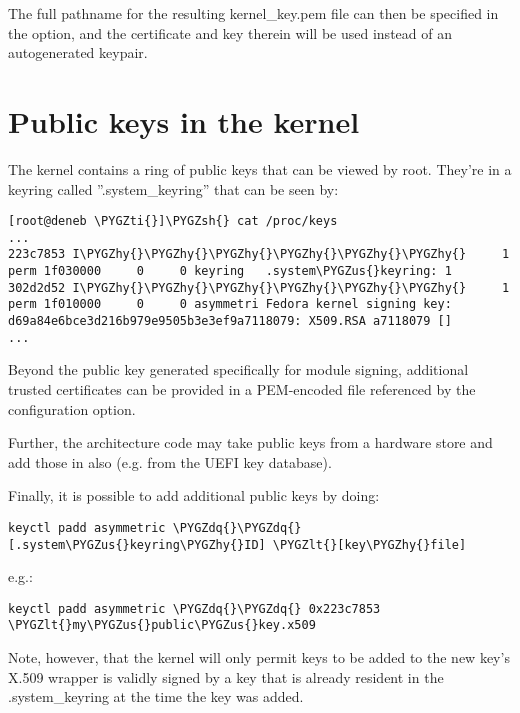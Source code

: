 \documentclass[a4paper,8pt,english]{sphinxmanual}
\def\PYGZus{\char`\_}
\def\PYGZlt{\char`\<}
\def\PYGZsh{\char`\#}
\def\PYGZhy{\char`\-}
\def\PYGZdq{\char`\"}
\def\PYGZti{\char`\~}
\begin{document}
The full pathname for the resulting kernel\_key.pem file can then be specified
in the  option, and the certificate and key therein will
be used instead of an autogenerated keypair.


\section{Public keys in the kernel}
\label{admin-guide/module-signing:public-keys-in-the-kernel}
The kernel contains a ring of public keys that can be viewed by root.  They're
in a keyring called ''.system\_keyring'' that can be seen by:

\begin{Verbatim}[commandchars=\\\{\}]
[root@deneb \PYGZti{}]\PYGZsh{} cat /proc/keys
...
223c7853 I\PYGZhy{}\PYGZhy{}\PYGZhy{}\PYGZhy{}\PYGZhy{}\PYGZhy{}     1 perm 1f030000     0     0 keyring   .system\PYGZus{}keyring: 1
302d2d52 I\PYGZhy{}\PYGZhy{}\PYGZhy{}\PYGZhy{}\PYGZhy{}\PYGZhy{}     1 perm 1f010000     0     0 asymmetri Fedora kernel signing key: d69a84e6bce3d216b979e9505b3e3ef9a7118079: X509.RSA a7118079 []
...
\end{Verbatim}

Beyond the public key generated specifically for module signing, additional
trusted certificates can be provided in a PEM-encoded file referenced by the
 configuration option.

Further, the architecture code may take public keys from a hardware store and
add those in also (e.g. from the UEFI key database).

Finally, it is possible to add additional public keys by doing:

\begin{Verbatim}[commandchars=\\\{\}]
keyctl padd asymmetric \PYGZdq{}\PYGZdq{} [.system\PYGZus{}keyring\PYGZhy{}ID] \PYGZlt{}[key\PYGZhy{}file]
\end{Verbatim}

e.g.:

\begin{Verbatim}[commandchars=\\\{\}]
keyctl padd asymmetric \PYGZdq{}\PYGZdq{} 0x223c7853 \PYGZlt{}my\PYGZus{}public\PYGZus{}key.x509
\end{Verbatim}

Note, however, that the kernel will only permit keys to be added to
 the new key's X.509 wrapper is validly signed by a key
that is already resident in the .system\_keyring at the time the key was added.
\end{document}
